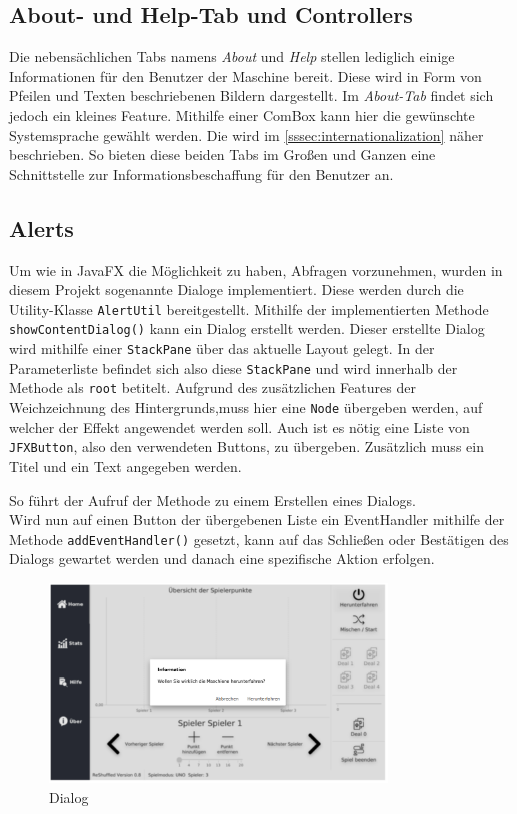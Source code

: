 \subsection{About- und Help-Tab und Controllers}
Die nebensächlichen Tabs namens \textit{About} und \textit{Help} stellen lediglich einige Informationen für den Benutzer der Maschine bereit.
Diese wird in Form von Pfeilen und Texten beschriebenen Bildern dargestellt.
Im \textit{About-Tab} findet sich jedoch ein kleines Feature.
Mithilfe einer ComBox kann hier die gewünschte Systemsprache gewählt werden.
Die  wird im \autoref{sssec:internationalization} näher beschrieben.
So bieten diese beiden Tabs im Großen und Ganzen eine Schnittstelle zur Informationsbeschaffung für den Benutzer an.
\subsection{Alerts}\label{sssec:alert}
Um wie in JavaFX die Möglichkeit zu haben, Abfragen vorzunehmen, wurden in diesem Projekt sogenannte Dialoge implementiert.
Diese werden durch die Utility-Klasse \lstinline[style=java]{AlertUtil} bereitgestellt.
Mithilfe der implementierten Methode \lstinline[style=java]{showContentDialog()} kann ein Dialog erstellt werden.
Dieser erstellte Dialog wird mithilfe einer \lstinline[style=java]{StackPane} über das aktuelle Layout gelegt.
In der Parameterliste befindet sich also diese \lstinline[style=java]{StackPane} und wird innerhalb der Methode als \lstinline[style=java]{root} betitelt.
Aufgrund des zusätzlichen Features der Weichzeichnung des Hintergrunds,muss hier eine \lstinline[style=java]{Node} übergeben werden, auf welcher der Effekt angewendet werden soll.
Auch ist es nötig eine Liste von \lstinline[style=java]{JFXButton}, also den verwendeten Buttons, zu übergeben.
Zusätzlich muss ein Titel und ein Text angegeben werden.

So führt der Aufruf der Methode zu einem Erstellen eines Dialogs.\\
Wird nun auf einen Button der übergebenen Liste ein EventHandler mithilfe der Methode \lstinline[style=java]{addEventHandler()} gesetzt,
kann auf das Schließen oder Bestätigen des Dialogs gewartet werden und danach eine spezifische Aktion erfolgen.
\begin{figure}[H]
\centering
\includegraphics[width=0.8\textwidth]{fig/ainf/Shutdown-Dialog.png}
\caption{Dialog}
\label{shutdown}
\end{figure}
